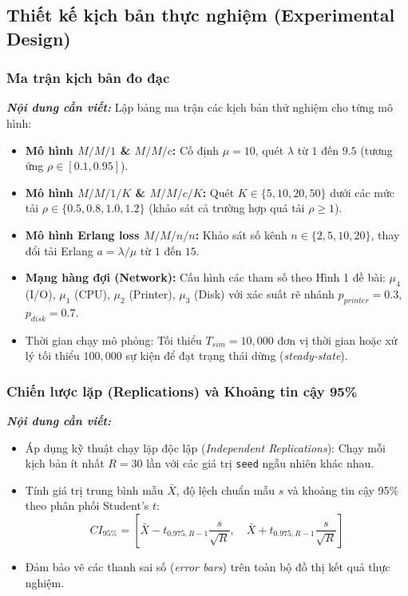 \subsection{Thiết kế kịch bản thực nghiệm (Experimental Design)}
\label{subsec:experimental-design}

\subsubsection{Ma trận kịch bản đo đạc}
\textit{\textbf{Nội dung cần viết:}}
Lập bảng ma trận các kịch bản thử nghiệm cho từng mô hình:
\begin{itemize}[leftmargin=1.5em]
    \item \textbf{Mô hình $M/M/1$ \& $M/M/c$:} Cố định $\mu = 10$, quét $\lambda$ từ $1$ đến $9.5$ (tương ứng $\rho \in [0.1, 0.95]$).
    \item \textbf{Mô hình $M/M/1/K$ \& $M/M/c/K$:} Quét $K \in \{5, 10, 20, 50\}$ dưới các mức tải $\rho \in \{0.5, 0.8, 1.0, 1.2\}$ (khảo sát cả trường hợp quá tải $\rho \ge 1$).
    \item \textbf{Mô hình Erlang loss $M/M/n/n$:} Khảo sát số kênh $n \in \{2, 5, 10, 20\}$, thay đổi tải Erlang $a = \lambda/\mu$ từ $1$ đến $15$.
    \item \textbf{Mạng hàng đợi (Network):} Cấu hình các tham số theo Hình 1 đề bài: $\mu_4$ (I/O), $\mu_1$ (CPU), $\mu_2$ (Printer), $\mu_3$ (Disk) với xác suất rẽ nhánh $p_{printer}=0.3$, $p_{disk}=0.7$.
    \item Thời gian chạy mô phỏng: Tối thiểu $T_{sim} = 10{,}000$ đơn vị thời gian hoặc xử lý tối thiểu $100{,}000$ sự kiện để đạt trạng thái dừng (\textit{steady-state}).
\end{itemize}

\subsubsection{Chiến lược lặp (Replications) và Khoảng tin cậy 95\%}
\textit{\textbf{Nội dung cần viết:}}
\begin{itemize}[leftmargin=1.5em]
    \item Áp dụng kỹ thuật chạy lặp độc lập (\textit{Independent Replications}): Chạy mỗi kịch bản ít nhất $R = 30$ lần với các giá trị \texttt{seed} ngẫu nhiên khác nhau.
    \item Tính giá trị trung bình mẫu $\bar{X}$, độ lệch chuẩn mẫu $s$ và khoảng tin cậy 95\% theo phân phối Student's $t$:
    \begin{equation}
        CI_{95\%} = \left[ \bar{X} - t_{0.975, R-1} \frac{s}{\sqrt{R}}, \quad \bar{X} + t_{0.975, R-1} \frac{s}{\sqrt{R}} \right]
    \end{equation}
    \item Đảm bảo vẽ các thanh sai số (\textit{error bars}) trên toàn bộ đồ thị kết quả thực nghiệm.
\end{itemize}

